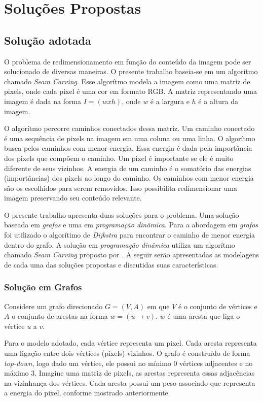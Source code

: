 \chapter{Soluções Propostas}

\section{Solução adotada}

O problema de redimensionamento em função do conteúdo da imagem 
pode ser solucionado de diversas maneiras. O presente trabalho 
baseia-se em um algorítmo chamado \emph{Seam Carving}. Esse 
algorítmo modela a imagem como uma matriz de pixels, onde cada
pixel é uma cor em formato RGB. A matriz representando uma imagem
é dada na forma $I = (wxh)$, onde $w$ é a largura e $h$ é a altura
da imagem. 

O algorítmo percorre caminhos conectados dessa matriz. 
Um caminho conectado é uma sequência de pixels na imagem em uma 
coluna ou uma linha. O algorítmo busca pelos caminhos com menor
energia. Essa energia é dada pela importância dos pixels que 
compõem o caminho. Um pixel é importante se ele é muito diferente
de seus vizinhos. A energia de um caminho é o somatório das energias
(importâncias) dos pixels ao longo do caminho. Os caminhos com menor
energia são os escolhidos para serem removidos. Isso possibilita 
redimensionar uma imagem preservando seu conteúdo relevante.

O presente trabalho apresenta duas soluções para o problema. Uma solução 
baseada em \emph{grafos} e uma em \emph{programação dinâmica}. 
Para a abordagem em \emph{grafos} foi utilizado o algorítimo de 
\emph{Dijkstra} para encontrar o caminho de menor energia dentro do grafo. 
A solução em \emph{programação dinâmica} utiliza um algorítmo chamado 
\emph{Seam Carving} proposto por \citep{shai2007seam}.
A seguir serão apresentadas as modelagens de cada uma das soluções propostas
e discutidas suas características.


\subsection{Solução em Grafos}
Considere um grafo direcionado $G=(V,A)$ em que $V$ é o conjunto de vértices 
e $A$ o conjunto de arestas na forma $w=(u \to v)$.
$w$ é uma aresta que liga o vértice $u$ a $v$. 

Para o modelo adotado, cada vértice representa um pixel. 
Cada aresta representa uma ligação entre dois vértices (pixels) vizinhos. 
O grafo é construído de forma \emph{top-down}, logo dado um vértice, ele 
possui no mínimo 0 vértices adjacentes e no máximo 3. 
Imagine uma matriz de pixels, as arestas representa essas adjacências na 
vizinhança dos vértices.
Cada aresta possui um peso associado que representa a energia do pixel, 
conforme mostrado anteriormente.

